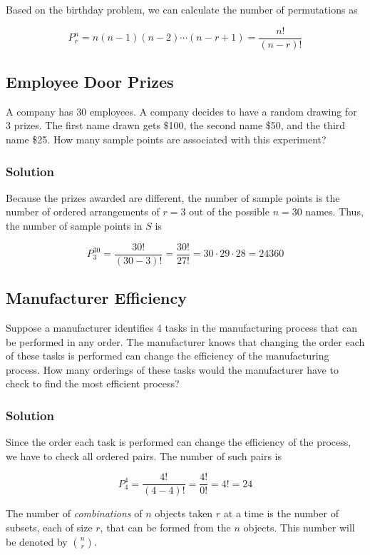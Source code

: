 \documentclass[11pt]{article}
\theoremstyle{definition}
\begin{document}
Based on the birthday problem, we can calculate the number of permutations as

$$
	P^n_r = n(n-1)(n-2)\cdots(n-r+1) = \frac{n!}{(n-r)!}
$$

\subsection{Employee Door Prizes}

A company has 30 employees. A company decides to have a random drawing for 3 prizes. The first name drawn gets \$100, the second name \$50, and the third name \$25. How many sample points are associated with this experiment?

\subsubsection*{Solution}

Because the prizes awarded are different, the number of sample points is the number of ordered arrangements of $r=3$ out of the possible $n=30$ names. Thus, the number of sample points in $S$ is

$$
	P^{30}_3 = \frac{30!}{(30-3)!} = \frac{30!}{27!} = 30 \cdot 29 \cdot 28 = 24360
$$

\subsection{Manufacturer Efficiency}

Suppose a manufacturer identifies 4 tasks in the manufacturing process that can be performed in any order. The manufacturer knows that changing the order each of these tasks is performed can change the efficiency of the manufacturing process. How many orderings of these tasks would the manufacturer have to check to find the most efficient process?

\subsubsection*{Solution}

Since the order each task is performed can change the efficiency of the process, we have to check all ordered pairs. The number of such pairs is

$$
	P^4_4 = \frac{4!}{(4-4)!} = \frac{4!}{0!} = 4! = 24
$$

\begin{shaded}
	The number of \textit{combinations} of $n$ objects taken $r$ at a time is the number of subsets, each of size $r$, that can be formed from the $n$ objects. This number will be denoted by $n \choose r$.
\end{shaded}
\end{document}
